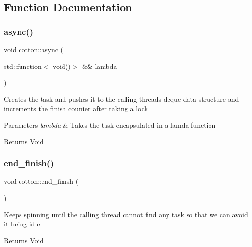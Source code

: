 \subsection{Function Documentation}
\mbox{\label{namespacecotton_a3a7e86503c4fd0c48774e2ffc43d947a}} 
\subsubsection{\texorpdfstring{async()}{async()}}
{\footnotesize\ttfamily void cotton\+::async (\begin{DoxyParamCaption}\item[{std\+::function$<$ void()$>$ \&\&}]{lambda }\end{DoxyParamCaption})}

Creates the task and pushes it to the calling thread\textquotesingle{}s deque data structure and increments the finish counter after taking a lock


\begin{DoxyParams}{Parameters}
{\em lambda} & Takes the task encapsulated in a lamda function \\
\hline
\end{DoxyParams}
\begin{DoxyReturn}{Returns}
Void 
\end{DoxyReturn}
\mbox{\label{namespacecotton_ab413e05e91ff6e4918aa9aa63d52b2ff}} 
\subsubsection{\texorpdfstring{end\+\_\+finish()}{end\_finish()}}
{\footnotesize\ttfamily void cotton\+::end\+\_\+finish (\begin{DoxyParamCaption}{ }\end{DoxyParamCaption})}

Keeps spinning until the calling thread cannot find any task so that we can avoid it being idle

\begin{DoxyReturn}{Returns}
Void 
\end{DoxyReturn}
\mbox{\label{namespacecotton_a3061b2929300562580e4bf1416372c3f}} 
